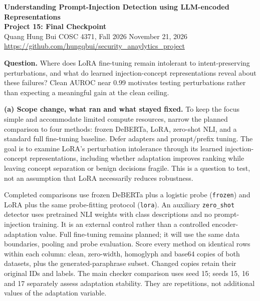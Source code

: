 \documentclass[10pt]{article}
\makeatletter
\renewcommand\section{\@startsection{section}{1}{0pt}{1.2ex plus .5ex minus .2ex}{.6ex plus .2ex}{\normalfont\large\bfseries}}
\newcommand{\code}[1]{\nolinkurl{#1}}
\makeatother
\begin{document}
\begin{center}
{\large\bfseries Understanding Prompt-Injection Detection using LLM-encoded Representations}\\[3pt]
{\bfseries Project 15: Final Checkpoint}\\
Quang Hung Bui \quad COSC 4371, Fall 2026 \quad November 21, 2026\\
\url{https://github.com/hungqbui/security_anaylytics_project}
\end{center}

\fontsize{9}{10.3}\selectfont
\section{Main comparison}
\textbf{Question.} Where does LoRA fine-tuning remain intolerant to intent-preserving perturbations, and what do learned injection-concept representations reveal about these failures? Clean AUROC near 0.99 motivates testing perturbations rather than expecting a meaningful gain at the clean ceiling.

\textbf{(a) Scope change, what ran and what stayed fixed.} To keep the focus simple and accommodate limited compute resources, narrow the planned comparison to four methods: frozen DeBERTa, LoRA, zero-shot NLI, and a standard full fine-tuning baseline. Defer adapters and prompt/prefix tuning. The goal is to examine LoRA's perturbation intolerance through its learned injection-concept representations, including whether adaptation improves ranking while leaving concept separation or benign decisions fragile. This is a question to test, not an assumption that LoRA necessarily reduces robustness.

Completed comparisons use frozen DeBERTa plus a logistic probe (\code{frozen}) and LoRA plus the same probe-fitting protocol (\code{lora}). An auxiliary \code{zero\_shot} detector uses pretrained NLI weights with class descriptions and no prompt-injection training. It is an external control rather than a controlled encoder-adaptation value. Full fine-tuning remains planned; it will use the same data boundaries, pooling and probe evaluation. Score every method on identical rows within each column: clean, zero-width, homoglyph and base64 copies of both datasets, plus the generated-paraphrase subset. Changed copies retain their original IDs and labels. The main checker comparison uses seed 15; seeds 15, 16 and 17 separately assess adaptation stability. They are repetitions, not additional values of the adaptation variable.
\end{document}
